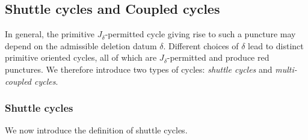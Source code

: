 \documentclass[11pt]{amsart}
\numberwithin{equation}{section}
\theoremstyle{definition}
\begin{document}
\subsection{Shuttle cycles and Coupled cycles}
In general, the primitive \(J_\delta\)-permitted cycle giving rise to such a puncture may depend on the admissible deletion datum \(\delta\). Different choices of \(\delta\) lead to distinct primitive oriented cycles, all of which are \(J_\delta\)-permitted and produce red punctures. We therefore introduce two types of cycles: \emph{shuttle cycles} and \emph{multi-coupled cycles}.


\subsubsection{Shuttle cycles}
We now introduce the definition of shuttle cycles.
\end{document}
